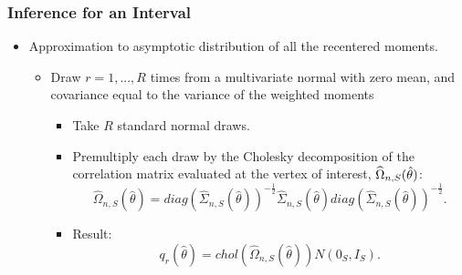\documentclass[notes=show]{beamer}
\begin{document}

\begin{frame}
\frametitle{Inference for an Interval}

\begin{itemize}
\item Approximation to asymptotic distribution of all the recentered
moments. 

\begin{itemize}
\item Draw $r=1,...,R$ times from a multivariate normal with zero mean, and 
covariance equal to the variance of the weighted moments 

\begin{itemize}
\item Take $R$ standard normal draws. 

\item Premultiply each draw by the Cholesky decomposition of the correlation
matrix evaluated at the vertex of interest, $\widehat{\Omega}_{n,S}(\hat{%
\theta})$:  
\begin{equation*}
\widehat{\Omega }_{n,S}(\hat{\theta})=diag(\widehat{\Sigma}_{n,S}(\hat{\theta%
}))^{-\frac{1}{2}}\widehat{\Sigma}_{n,S}(\hat{\theta})diag(\widehat{\Sigma}%
_{n,S}(\hat{\theta}))^{-\frac{1}{2}}.
\end{equation*}

\item Result:  
\begin{equation*}
q_{r}(\hat{\theta})=chol(\widehat{\Omega}_{n,S}(\hat{\theta}))N(0_{S},I_{S}).
\end{equation*}
\end{itemize}
\end{itemize}
\end{itemize}
\end{frame}

\end{document}
